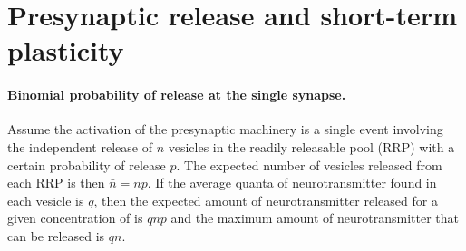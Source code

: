 \section{Presynaptic release and short-term plasticity}

\paragraph{Binomial probability of release at the single synapse.} Assume the activation of the presynaptic machinery is a single event involving the independent release of $n$ vesicles in the  readily releasable pool (RRP) with a certain probability of release $p$. 
The expected number of vesicles released from each RRP is then $\bar{n}=np$. If the average quanta of neurotransmitter found in each vesicle is $q$, then the expected amount of neurotransmitter released for a given concentration of {\calcium} is $q n p$ and the maximum amount of neurotransmitter that can be released is $qn$. 

